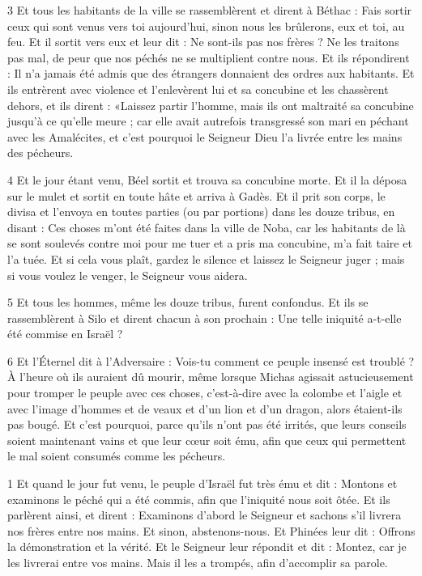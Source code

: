 \par 3 Et tous les habitants de la ville se rassemblèrent et dirent à Béthac : Fais sortir ceux qui sont venus vers toi aujourd'hui, sinon nous les brûlerons, eux et toi, au feu. Et il sortit vers eux et leur dit : Ne sont-ils pas nos frères ? Ne les traitons pas mal, de peur que nos péchés ne se multiplient contre nous. Et ils répondirent : Il n'a jamais été admis que des étrangers donnaient des ordres aux habitants. Et ils entrèrent avec violence et l'enlevèrent lui et sa concubine et les chassèrent dehors, et ils dirent : «Laissez partir l'homme, mais ils ont maltraité sa concubine jusqu'à ce qu'elle meure ; car elle avait autrefois transgressé son mari en péchant avec les Amalécites, et c'est pourquoi le Seigneur Dieu l'a livrée entre les mains des pécheurs.

\par 4 Et le jour étant venu, Béel sortit et trouva sa concubine morte. Et il la déposa sur le mulet et sortit en toute hâte et arriva à Gadès. Et il prit son corps, le divisa et l'envoya en toutes parties (ou par portions) dans les douze tribus, en disant : Ces choses m'ont été faites dans la ville de Noba, car les habitants de là se sont soulevés contre moi pour me tuer et a pris ma concubine, m'a fait taire et l'a tuée. Et si cela vous plaît, gardez le silence et laissez le Seigneur juger ; mais si vous voulez le venger, le Seigneur vous aidera.

\par 5 Et tous les hommes, même les douze tribus, furent confondus. Et ils se rassemblèrent à Silo et dirent chacun à son prochain : Une telle iniquité a-t-elle été commise en Israël ?

\par 6 Et l'Éternel dit à l'Adversaire : Vois-tu comment ce peuple insensé est troublé ? À l'heure où ils auraient dû mourir, même lorsque Michas agissait astucieusement pour tromper le peuple avec ces choses, c'est-à-dire avec la colombe et l'aigle et avec l'image d'hommes et de veaux et d'un lion et d'un dragon, alors étaient-ils pas bougé. Et c'est pourquoi, parce qu'ils n'ont pas été irrités, que leurs conseils soient maintenant vains et que leur cœur soit ému, afin que ceux qui permettent le mal soient consumés comme les pécheurs.


\par 1 Et quand le jour fut venu, le peuple d'Israël fut très ému et dit : Montons et examinons le péché qui a été commis, afin que l'iniquité nous soit ôtée. Et ils parlèrent ainsi, et dirent : Examinons d'abord le Seigneur et sachons s'il livrera nos frères entre nos mains. Et sinon, abstenons-nous. Et Phinées leur dit : Offrons la démonstration et la vérité. Et le Seigneur leur répondit et dit : Montez, car je les livrerai entre vos mains. Mais il les a trompés, afin d'accomplir sa parole.

